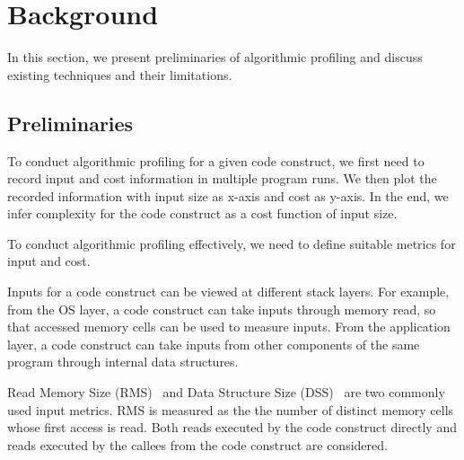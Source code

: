 
\section{Background}
\label{sec:back}

In this section, we present preliminaries of 
algorithmic profiling and discuss existing techniques and their
limitations. 

\subsection{Preliminaries}
\label{subsec:pre}

To conduct algorithmic profiling for a given code construct,
we first need to record input and cost information in multiple program runs. 
We then plot the recorded information with input size as x-axis and cost as y-axis.
In the end, we infer complexity for the code construct as a cost function of input size. 

To conduct algorithmic profiling effectively, 
we need to define suitable metrics for input and cost. 

%
Inputs for a code construct can be viewed at different stack layers.
For example, from the OS layer, a code construct can take 
inputs through memory read, 
so that accessed memory cells can be used to measure inputs.
From the application layer, a code construct can take inputs 
from other components of the same 
program through internal data structures. 

Read Memory Size (RMS)~\citep{Aprof1,Aprof2}  and Data Structure Size (DSS)~\citep{AlgoProf} 
are two commonly used input metrics. 
RMS is measured as the the number of distinct memory cells 
whose first access is read. Both reads executed by the code 
construct directly and  reads executed by the callees from 
the code construct are considered. 


